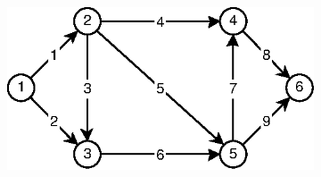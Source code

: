 \begin{figure}[!htbp]
	\centering
	\begin{subfigure}[b]{0.45\textwidth}
		\includegraphics[width=\textwidth]{Chapter_I/2/1_2a.eps}
		\caption{}
	\end{subfigure}
	\qquad
	\begin{subfigure}[b]{0.09\textwidth}

\end{subfigure}
\end{figure}
